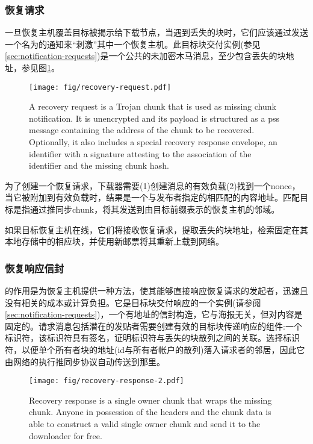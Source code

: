 \subsubsection{恢复请求}

一旦恢复主机覆盖目标被揭示给下载节点，当遇到丢失的块时，它们应该通过发送一个名为的通知来“刺激”其中一个恢复主机。此目标块交付实例(参见\ref{sec:notification-requests})是一个公共的未加密木马消息，至少包含丢失的块地址，参见图\ref{fig:recovery-request}。

\begin{figure}[htbp]
  \centering
  \texttt{[image: fig/recovery-request.pdf]}
  \caption[Recovery request \statusgreen]{A recovery request is a Trojan chunk that is used as missing chunk notification. It is unencrypted and its payload is structured as a pss message containing the address of the chunk to be recovered. Optionally, it also includes a special recovery response envelope, an identifier with a signature attesting to the association of the identifier and the missing chunk hash.}
  \label{fig:recovery-request}
\end{figure}

为了创建一个恢复请求，下载器需要(1)创建消息的有效负载(2)找到一个nonce，当它被附加到有效负载时，结果是一个与发布者指定的相匹配的内容地址。匹配目标是指通过推同步chunk，将其发送到由目标前缀表示的恢复主机的邻域。 

如果目标恢复主机在线，它们将接收恢复请求，提取丢失的块地址，检索固定在其本地存储中的相应块，并使用新邮票将其重新上载到网络。

\subsubsection{恢复响应信封}

的作用是为恢复主机提供一种方法，使其能够直接响应恢复请求的发起者，迅速且没有相关的成本或计算负担。它是目标块交付响应的一个实例(请参阅\ref{sec:notification-requests})，一个有地址的信封构造，它与海报无关，但对内容是固定的。请求消息包括潜在的发贴者需要创建有效的目标块传递响应的组件:一个标识符，该标识符具有签名，证明标识符与丢失的块散列之间的关联。选择标识符，以便单个所有者块的地址(id与所有者帐户的散列)落入请求者的邻居，因此它由网络的执行推同步协议自动传送到那里。

\begin{figure}[htbp]
\centering
\texttt{[image: fig/recovery-response-2.pdf]}
\caption[Recovery response \statusgreen]{Recovery response is a single owner chunk that wraps the missing chunk. Anyone in possession of the headers and the chunk data is able to construct a valid single owner chunk and send it to the downloader for free.}
\label{fig:recovery-response}
\end{figure}

